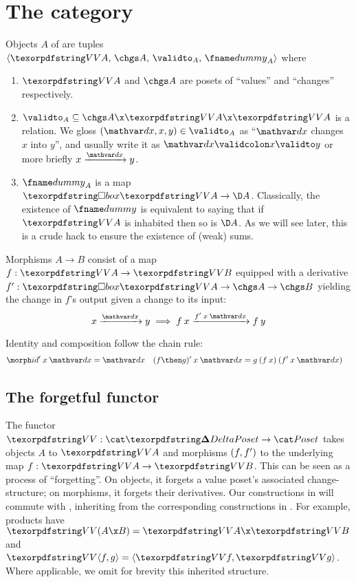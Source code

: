 \section{The category \CP}
\label{sec:changeposet}

Objects $A$ of \CP{} are tuples $\tuple{\vals A,\, \chgs A,\, {\validto_A},\,
  \dummy_A}$ where
%
\begin{enumerate}
\item $\vals A$ and $\chgs A$ are posets of ``values'' and ``changes'' respectively.

\item ${\validto_A} \subseteq \chgs A \x \vals A \x \vals A$ is a relation. We
  gloss $(\dx,x,y) \in {\validto_A}$ as ``$\dx$ changes $x$ into $y$'', and
  usually write it as $\valid \dx x y$ or more briefly $\vld \dx x y$.

\item $\dummy_A$ is a map $\iso \vals A \to \D A$. Classically, the existence of
  $\dummy$ is equivalent to saying that if $\vals A$ is inhabited then so is $\D
  A$. As we will see later, this is a crude hack to ensure the existence of
  (weak) sums.
\end{enumerate}

\noindent
Morphisms $A \to B$ consist of a map $f : \vals A \to \vals B$ equipped with a
derivative $\deriv f : \iso \vals A \to \chgs A \to \chgs B$ yielding the change
in $f$'s output given a change to its input:
%
\begin{equation}\label{eqn:deriv}
    \vld \dx x y \implies \vld {\deriv f \<x\<\dx} {f\<x}{f\<y}
\end{equation}

\noindent
Identity and composition follow the chain rule:
%
\begin{align*}
  \deriv \id \<x \<\dx &= \dx &
  \deriv{(f \then g)} \<x \<\dx &= g \<(f\<x) \<(\deriv f \<x \<\dx)
\end{align*}


\subsection{\boldmath The forgetful functor \valfn}

The functor $\valfn : \CP \to \Poset$ takes objects $A$ to $\vals A$ and
morphisms $(f,f')$ to the underlying map $f : \vals A \to \vals B$. This
can be seen as a process of ``forgetting''. On objects, it forgets a value
poset's associated change-structure; on morphisms, it forgets their derivatives.
%
Our constructions in \CP{} will commute with \valfn, inheriting from the
corresponding constructions in \Poset. For example, products have $\vals{(A \x
  B)} = \vals A \x \vals B$ and $\vals{\fork{f,g}} = \fork{\vals f, \vals g}$.
%
Where applicable, we omit for brevity this inherited structure.

